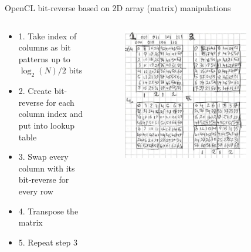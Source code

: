 \documentclass[aspectratio=169]{beamer}
\begin{document}
\begin{frame}{}
\begin{columns}
\begin{column}{0.50\textwidth}
\begin{figure}
			\end{figure}
		\end{column}
	\end{columns}
	\endgroup
\end{frame}

\begin{frame}{}
	\begingroup
	\small
	OpenCL bit-reverse based on 2D array (matrix) manipulations
	\begin{columns}
		\begin{column}{0.50\textwidth}
				\begin{itemize}
					\item 1. Take index of columns as bit patterns up to $\log_2(N)/2$ bits
					\item 2. Create bit-reverse for each column index and put into lookup table
					\item 3. Swap every column with its bit-reverse for every row
					\item 4. Transpose the matrix
					\item 5. Repeat step 3
				\end{itemize}
		\end{column}
		\begin{column}{0.50\textwidth}
			\begin{figure}
				\includegraphics[width=0.8\textwidth]{resources/images/bit-reverse.png}
			\end{figure}
		\end{column}
	\end{columns}
	\endgroup
\end{frame}
\end{document}
